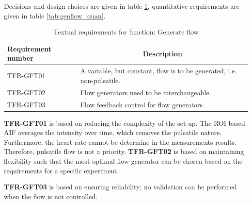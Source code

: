 Decisions and design choices are given in table \ref{tab:genflow_text}, quantitative requirements are given in table \ref{tab:genflow_quan}.

\begin{table}[H]
\caption{Textual requirements for function: Generate flow}
\label{tab:genflow_text}
\begin{tabular}{p{25mm}|p{115mm}|}
	\textbf{Requirement number} & \multicolumn{1}{c}{\textbf{Description}} \\
	\hline
	TFR-GFT01 & A variable, but constant, flow is to be generated, i.e. non-pulsatile. \\
	TFR-GFT02 & Flow generators need to be interchangeable. \\
	TFR-GFT03 & Flow feedback control for flow generators. \\
	\cline{2-2}
\end{tabular}
\end{table}

\textbf{TFR-GFT01} is based on reducing the complexity of the set-up. The ROI based AIF averages the intensity over time, which removes the pulsatile nature. Furthermore, the heart rate cannot be determine in the measurements results. Therefore, pulsatile flow is not a priority.
\textbf{TFR-GFT02} is based on maintaining flexibility such that the most optimal flow generator can be chosen based on the requirements for a specific experiment.

\textbf{TFR-GFT03} is based on ensuring reliability; no validation can be performed when the flow is not controlled.


